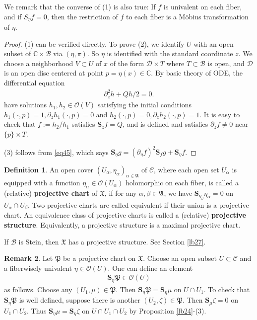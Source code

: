\documentclass[12pt,a4paper,notitlepage]{article}
\theoremstyle{definition}
\newtheorem{df}{Definition}[section]
\newtheorem{rem}[df]{Remark}
\theoremstyle{plain}
\newcommand{\fk}{\mathfrak}
\newcommand{\mc}{\mathcal}
\newcommand{\scr}{\mathscr}
\newcommand{\Cbb}{\mathbb C}
\newcommand{\Sbf}{\mathbf{S}}
\numberwithin{equation}{section}
\begin{document}
We remark that the converse of (1) is also true: If $f$ is univalent on each fiber, and if $S_\eta f=0$, then the restriction of $f$ to each fiber is a M\"obius transformation of $\eta$.

\begin{proof}
(1) can be verified directly. To prove (2), we identify $U$ with an open subset of $\Cbb\times\mc B$ via $(\eta,\pi)$. So $\eta$ is identified with the standard coordinate $z$. We choose a neighborhood $V\subset U$ of $x$ of the form $\mc D\times T$ where $T\subset\mc B$ is open, and $\mc D$ is an open disc centered at point $p=\eta(x)\in\Cbb$. By basic theory of ODE, the  differential equation
	\begin{align*}
	\partial_z^2h+Qh/2=0.
	\end{align*}
have solutions $h_1,h_2\in\scr O(V)$ satisfying  the initial conditions $h_1(\cdot,p)=1,\partial_z h_1(\cdot,p)=0$ and $h_2(\cdot,p)=0,\partial_z h_2(\cdot,p)=1$. It is easy to check that $f:=h_2/h_1$ satisfies $\Sbf_z f=Q$, and is defined and satisfies $\partial_zf\neq 0$ near $\{p\}\times T$.
	
(3) follows from \eqref{eq45}, which says $\Sbf_\eta g=(\partial_\eta f)^2\Sbf_fg+\Sbf_\eta f$. 
\end{proof}



\begin{df}
	An open cover $(U_\alpha,\eta_\alpha)_{\alpha\in\fk A}$ of $\mc C$, where each open set $U_\alpha$ is equipped with a function $\eta_\alpha\in\scr O(U_\alpha)$ holomorphic on each fiber, is called a (relative) \textbf{projective chart} of $\fk X$, if for any $\alpha,\beta\in\fk A$, we have $\Sbf_{\eta_\beta}\eta_\alpha=0$ on $U_\alpha\cap U_\beta$. Two projective charts are called equivalent if their union is a projective chart. An equivalence class of projective charts is called a (relative) \textbf{projective structure}. Equivalently, a projective structure is a maximal projective chart.
\end{df}


If $\mc B$ is Stein, then $\fk X$ has a projective structure. See Section \ref{lb27}.



\begin{rem}\label{lb25}
	Let $\fk P$ be a projective chart on $\fk X$. Choose an open subset $U\subset\mc C$ and a fiberwisely univalent $\eta\in\scr O(U)$. One can \index{S@$\Sbf_\eta f,\Sbf_\eta\fk P$} define an element 
	\begin{align*}
	\Sbf_\eta\fk P\in \scr O(U)
	\end{align*}
	as follows. Choose any $(U_1,\mu)\in\fk P$. Then $\Sbf_\eta\fk P=\Sbf_\eta\mu$ on $U\cap U_1$. To check that $\Sbf_\eta\fk P$ is well defined, suppose there is another $(U_2,\zeta)\in\fk P$. Then $\Sbf_\mu\zeta=0$ on $U_1\cap U_2$. Thus $\Sbf_\eta\mu=\Sbf_\eta\zeta$ on $U\cap U_1\cap U_2$ by Proposition \ref{lb24}-(3).
\end{rem}
\end{document}

